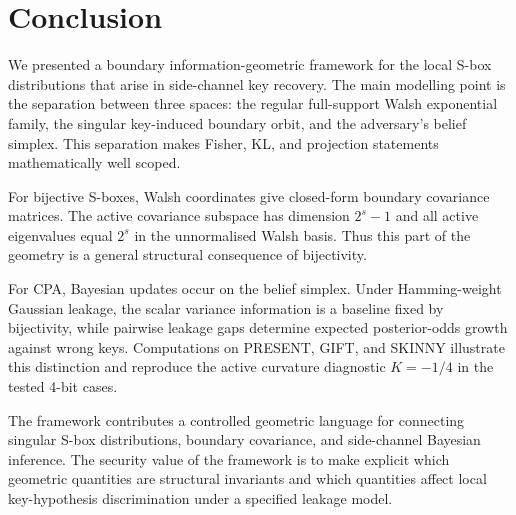 \section{Conclusion}\label{sec:conclusion}

We presented a boundary information-geometric framework for the local S-box
distributions that arise in side-channel key recovery.  The main modelling
point is the separation between three spaces: the regular full-support Walsh
exponential family, the singular key-induced boundary orbit, and the
adversary's belief simplex.  This separation makes Fisher, KL, and projection
statements mathematically well scoped.

For bijective S-boxes, Walsh coordinates give closed-form boundary covariance
matrices.  The active covariance subspace has dimension $2^s-1$ and all active
eigenvalues equal $2^s$ in the unnormalised Walsh basis.  Thus this part of the
geometry is a general structural consequence of bijectivity.

For CPA, Bayesian updates occur on the belief simplex.  Under Hamming-weight
Gaussian leakage, the scalar variance information is a baseline fixed by
bijectivity, while pairwise leakage gaps determine expected posterior-odds
growth against wrong keys.  Computations on PRESENT, GIFT, and SKINNY
illustrate this distinction and reproduce the active curvature diagnostic
$K=-1/4$ in the tested 4-bit cases.

The framework contributes a controlled geometric language for connecting
singular S-box distributions, boundary covariance, and side-channel Bayesian
inference.
The security value of the framework is to make explicit which geometric
quantities are structural invariants and which quantities affect local
key-hypothesis discrimination under a specified leakage model.
